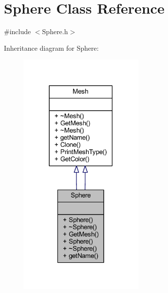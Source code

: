 \hypertarget{class_sphere}{}\section{Sphere Class Reference}
\label{class_sphere}


{\ttfamily \#include $<$Sphere.\+h$>$}



Inheritance diagram for Sphere\+:
\nopagebreak
\begin{figure}[H]
\begin{center}
\leavevmode
\includegraphics[width=177pt]{class_sphere__inherit__graph}
\end{center}
\end{figure}


